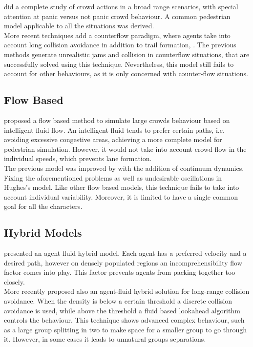 \documentclass[6pt]{article} %
\begin{document}
\begin{multicols}{2}
\cite{helbing2002} did a complete study of crowd actions in a broad range scenarios, with special attention at panic versus not panic crowd behaviour.
A common pedestrian model applicable to all the situations was derived.\\

More recent techniques add a counterflow paradigm, where agents take into account long collision avoidance in addition to trail formation, \cite{heliovaara2012}.
The previous methods generate unrealistic jams and collision in counterflow situations, that are successfully solved using this technique.
Nevertheless, this model still fails to account for other behaviours, as it is only concerned with counter-flow situations.

\subsection{Flow Based}

\cite{hughes2003} proposed a flow based method to simulate large crowds behaviour based on intelligent fluid flow.
An intelligent fluid tends to prefer certain paths, i.e. avoiding excessive congestive areas, achieving a more complete model for pedestrian simulation.
However, it would not take into account crowd flow in the individual speeds, which prevents lane formation.\\

The previous model was improved by \cite{treuille2006} with the addition of continuum dynamics.
Fixing the aforementioned problems as well as undesirable oscillations in Hughes's model.
Like other flow based models, this technique fails to take into account individual variability.
Moreover, it is limited to have a single common goal for all the characters.

\subsection{Hybrid Models}

\cite{Narain2009} presented an agent-fluid hybrid model.
Each agent has a preferred velocity and a desired path, however on densely populated regions an incomprehensibility flow factor comes into play.
This factor prevents agents from packing together too closely.\\

More recently \cite{lin2014} proposed also an agent-fluid hybrid solution for long-range collision avoidance.
When the density is below a certain threshold a discrete collision avoidance is used,
while above the threshold a fluid based lookahead algorithm controls the behaviour.
This technique shows advanced complex behaviour, such as a large group splitting in two to make space for a smaller group to go through it.
However, in some cases it leads to unnatural groups separations.


\end{multicols}
\end{document}
